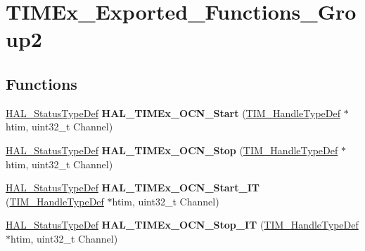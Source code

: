\hypertarget{group___t_i_m_ex___exported___functions___group2}{}\section{T\+I\+M\+Ex\+\_\+\+Exported\+\_\+\+Functions\+\_\+\+Group2}
\label{group___t_i_m_ex___exported___functions___group2}
\subsection*{Functions}
\begin{DoxyCompactItemize}
\item 
\mbox{\label{group___t_i_m_ex___exported___functions___group2_ga56d25f544564ef28a66dca7ec150de00}} 
\hyperlink{stm32f0xx__hal__def_8h_a63c0679d1cb8b8c684fbb0632743478f}{H\+A\+L\+\_\+\+Status\+Type\+Def} {\bfseries H\+A\+L\+\_\+\+T\+I\+M\+Ex\+\_\+\+O\+C\+N\+\_\+\+Start} (\hyperlink{struct_t_i_m___handle_type_def}{T\+I\+M\+\_\+\+Handle\+Type\+Def} $\ast$htim, uint32\+\_\+t Channel)
\item 
\mbox{\label{group___t_i_m_ex___exported___functions___group2_ga576cb1c3e40fc49555f232773cb2cdbc}} 
\hyperlink{stm32f0xx__hal__def_8h_a63c0679d1cb8b8c684fbb0632743478f}{H\+A\+L\+\_\+\+Status\+Type\+Def} {\bfseries H\+A\+L\+\_\+\+T\+I\+M\+Ex\+\_\+\+O\+C\+N\+\_\+\+Stop} (\hyperlink{struct_t_i_m___handle_type_def}{T\+I\+M\+\_\+\+Handle\+Type\+Def} $\ast$htim, uint32\+\_\+t Channel)
\item 
\mbox{\label{group___t_i_m_ex___exported___functions___group2_ga2f4d7c285095d5293b81d2e11cd991af}} 
\hyperlink{stm32f0xx__hal__def_8h_a63c0679d1cb8b8c684fbb0632743478f}{H\+A\+L\+\_\+\+Status\+Type\+Def} {\bfseries H\+A\+L\+\_\+\+T\+I\+M\+Ex\+\_\+\+O\+C\+N\+\_\+\+Start\+\_\+\+IT} (\hyperlink{struct_t_i_m___handle_type_def}{T\+I\+M\+\_\+\+Handle\+Type\+Def} $\ast$htim, uint32\+\_\+t Channel)
\item 
\mbox{\label{group___t_i_m_ex___exported___functions___group2_gabe91877781dbd7fb9fdd63262e6ea10f}} 
\hyperlink{stm32f0xx__hal__def_8h_a63c0679d1cb8b8c684fbb0632743478f}{H\+A\+L\+\_\+\+Status\+Type\+Def} {\bfseries H\+A\+L\+\_\+\+T\+I\+M\+Ex\+\_\+\+O\+C\+N\+\_\+\+Stop\+\_\+\+IT} (\hyperlink{struct_t_i_m___handle_type_def}{T\+I\+M\+\_\+\+Handle\+Type\+Def} $\ast$htim, uint32\+\_\+t Channel)

\end{DoxyCompactItemize}
